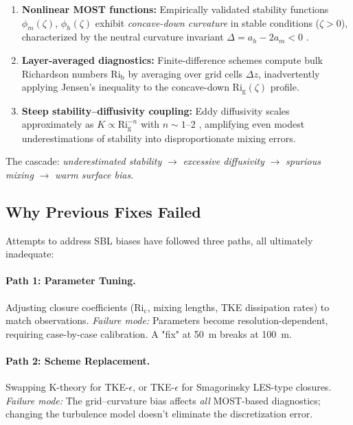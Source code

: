 \documentclass[twocolumn,11pt]{article}
\newcommand{\Rig}{\text{Ri}_{\text{g}}}
\newcommand{\Rib}{\text{Ri}_{\text{b}}}
\newcommand{\Ric}{\text{Ri}_{\text{c}}}
\begin{document}
\begin{enumerate}
\item \textbf{Nonlinear MOST functions:} Empirically validated stability functions $\phi_m(\zeta)$, $\phi_h(\zeta)$ exhibit \textit{concave-down curvature} in stable conditions ($\zeta > 0$), characterized by the neutral curvature invariant $\Delta = a_h - 2a_m < 0$ \citep{businger1971,hogstrom1988}.

\item \textbf{Layer-averaged diagnostics:} Finite-difference schemes compute bulk Richardson numbers $\Rib$ by averaging over grid cells $\Delta z$, inadvertently applying Jensen's inequality to the concave-down $\Rig(\zeta)$ profile.

\item \textbf{Steep stability--diffusivity coupling:} Eddy diffusivity scales approximately as $K \propto \Rig^{-n}$ with $n \sim 1$--2 \citep{louis1979}, amplifying even modest underestimations of stability into disproportionate mixing errors.
\end{enumerate}

\noindent The cascade: \textit{underestimated stability} $\rightarrow$ \textit{excessive diffusivity} $\rightarrow$ \textit{spurious mixing} $\rightarrow$ \textit{warm surface bias}.

\subsection{Why Previous Fixes Failed}

Attempts to address SBL biases have followed three paths, all ultimately inadequate:

\paragraph{Path 1: Parameter Tuning.} Adjusting closure coefficients ($\Ric$, mixing lengths, TKE dissipation rates) to match observations. \textit{Failure mode:} Parameters become resolution-dependent, requiring case-by-case calibration. A "fix" at 50~m breaks at 100~m.

\paragraph{Path 2: Scheme Replacement.} Swapping K-theory for TKE-$\epsilon$, or TKE-$\epsilon$ for Smagorinsky LES-type closures. \textit{Failure mode:} The grid--curvature bias affects \textit{all} MOST-based diagnostics; changing the turbulence model doesn't eliminate the discretization error.
\end{document}
